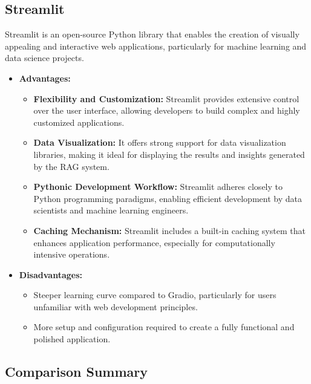 \documentclass[12pt]{report}
\begin{document}
\subsection{Streamlit}
Streamlit is an open-source Python library that enables the creation of visually appealing and interactive web applications, particularly for machine learning and data science projects.

\setlength{\itemsep}{1pt}
\setlength{\parskip}{0pt}

\begin{itemize}
    \item \textbf{Advantages:}
    \begin{itemize}
        \item \textbf{Flexibility and Customization:} Streamlit provides extensive control over the user interface, allowing developers to build complex and highly customized applications.
        \item \textbf{Data Visualization:} It offers strong support for data visualization libraries, making it ideal for displaying the results and insights generated by the RAG system.
        \item \textbf{Pythonic Development Workflow:} Streamlit adheres closely to Python programming paradigms, enabling efficient development by data scientists and machine learning engineers.
        \item \textbf{Caching Mechanism:} Streamlit includes a built-in caching system that enhances application performance, especially for computationally intensive operations.
    \end{itemize}
    \item \textbf{Disadvantages:}
    \begin{itemize}
        \item Steeper learning curve compared to Gradio, particularly for users unfamiliar with web development principles.
        \item More setup and configuration required to create a fully functional and polished application.
    \end{itemize}
\end{itemize}

\subsection{Comparison Summary}
\end{document}
